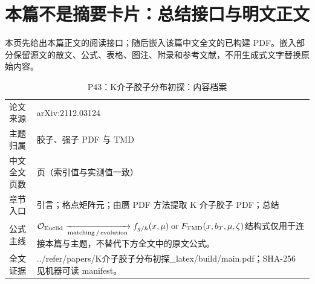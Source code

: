 \documentclass[UTF8,11pt,oneside]{ctexbook}
\begin{document}
\section*{本篇不是摘要卡片：总结接口与明文正文}
本页先给出本篇正文的阅读接口；随后嵌入该篇中文全文的已构建 PDF。嵌入部分保留源文的散文、公式、表格、图注、附录和参考文献，不用生成式文字替换原始内容。
\begin{table}[htbp]
  \centering
  \caption{P43：K介子胶子分布初探：内容档案}
  \small
  \begin{tabularx}{0.96\textwidth}{@{}p{3.3cm}>{\raggedright\arraybackslash}X@{}}
    \toprule
    论文来源 & arXiv:2112.03124 \\
    主题归属 & 胶子、强子 PDF 与 TMD \\
    中文全文页数 & 14 页（索引值与实测值一致） \\
    章节入口 & 引言；格点矩阵元；由赝 PDF 方法提取 K 介子胶子 PDF；总结 \\
    公式主线 & $\mathcal O_{\rm Euclid}\xrightarrow[\rm matching\,/\,evolution]{}f_{g/h}(x,\mu)\;{\rm or}\;F_{\rm TMD}(x,b_T,\mu,\zeta)$\newline\scriptsize 结构式仅用于连接本篇与主题，不替代下方全文中的原文公式。 \\
    全文证据 & ../\allowbreak{}refer/\allowbreak{}papers/\allowbreak{}K介子胶子分布初探\_\allowbreak{}latex/\allowbreak{}build/\allowbreak{}main.pdf；SHA-256 见机器可读 manifest。 \\
    \bottomrule
  \end{tabularx}
\end{table}
\end{document}
